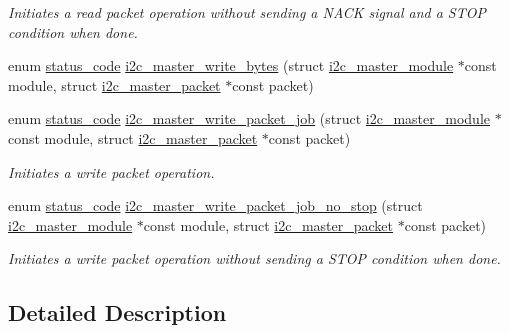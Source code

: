 \begin{DoxyCompactItemize}
\begin{DoxyCompactList}\small\item\em Initiates a read packet operation without sending a N\+A\+CK signal and a S\+T\+OP condition when done. \end{DoxyCompactList}\item 
enum \mbox{\hyperlink{group__group__sam0__utils__status__codes_ga751c892e5a46b8e7d282085a5a5bf151}{status\+\_\+code}} \mbox{\hyperlink{group__asfdoc__sam0__sercom__i2c__group_ga6f4d4f641c2bb1a905ad95a41ed3f741}{i2c\+\_\+master\+\_\+write\+\_\+bytes}} (struct \mbox{\hyperlink{structi2c__master__module}{i2c\+\_\+master\+\_\+module}} $\ast$const module, struct \mbox{\hyperlink{structi2c__master__packet}{i2c\+\_\+master\+\_\+packet}} $\ast$const packet)
\item 
enum \mbox{\hyperlink{group__group__sam0__utils__status__codes_ga751c892e5a46b8e7d282085a5a5bf151}{status\+\_\+code}} \mbox{\hyperlink{group__asfdoc__sam0__sercom__i2c__group_ga5527434ebf5f0442a9f9ed9146005cba}{i2c\+\_\+master\+\_\+write\+\_\+packet\+\_\+job}} (struct \mbox{\hyperlink{structi2c__master__module}{i2c\+\_\+master\+\_\+module}} $\ast$const module, struct \mbox{\hyperlink{structi2c__master__packet}{i2c\+\_\+master\+\_\+packet}} $\ast$const packet)
\begin{DoxyCompactList}\small\item\em Initiates a write packet operation. \end{DoxyCompactList}\item 
enum \mbox{\hyperlink{group__group__sam0__utils__status__codes_ga751c892e5a46b8e7d282085a5a5bf151}{status\+\_\+code}} \mbox{\hyperlink{group__asfdoc__sam0__sercom__i2c__group_gaf1ee33c8f9b65ede18200b33500dae7d}{i2c\+\_\+master\+\_\+write\+\_\+packet\+\_\+job\+\_\+no\+\_\+stop}} (struct \mbox{\hyperlink{structi2c__master__module}{i2c\+\_\+master\+\_\+module}} $\ast$const module, struct \mbox{\hyperlink{structi2c__master__packet}{i2c\+\_\+master\+\_\+packet}} $\ast$const packet)
\begin{DoxyCompactList}\small\item\em Initiates a write packet operation without sending a S\+T\+OP condition when done. \end{DoxyCompactList}\end{DoxyCompactItemize}


\subsection{Detailed Description}


